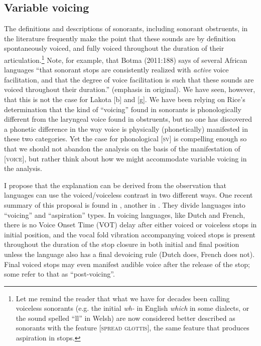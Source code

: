 \documentclass[output=paper]{LSP/langsci}
\begin{document}
\subsection{Variable voicing}

The definitions and descriptions of sonorants, including sonorant obstruents, in the literature frequently make the point that these sounds are by definition spontaneously voiced, and fully voiced throughout the duration of their articulation.\footnote{Let me remind the reader that what we have for decades been calling voiceless sonorants (e.g. the initial \textit{wh-} in English \textit{which} in some dialects, or the sound spelled ``ll'' in Welsh) are now considered better described as sonorants with the feature [\textsc{spread glottis}], the same feature that produces aspiration in stops.} Note, for example, that Botma (2011:188) says of several African languages ``that sonorant stops are consistently realized with \textit{active} voice facilitation, and that the degree of voice facilitation is such that these sounds are voiced throughout their duration.'' (emphasis in original). We have seen, however, that this is not the case for Lakota [b] and [g]. We have been relying on Rice's determination that the kind of ``voicing'' found in sonorants is phonologically different from the laryngeal voice found in obstruents, but no one has discovered a phonetic difference in the way voice is physically (phonetically) manifested in these two categories. Yet the case for phonological [\textsc{sv}] is compelling enough so that we should not abandon the analysis on the basis of the manifestation of [\textsc{voice}], but rather think about how we might accommodate variable voicing in the analysis.

I propose that the explanation can be derived from the observation that languages can use the voiced/voiceless contrast in two different ways. One recent summary of this proposal is found in \citet[15--19]{Harris2009}, another in \citet{RingenEtAl2013}. They divide languages into ``voicing'' and ``aspiration'' types. In voicing languages, like Dutch and French, there is no Voice Onset Time (VOT) delay after either voiced or voiceless stops in initial position, and the vocal fold vibration accompanying voiced stops is present throughout the duration of the stop closure in both initial and final position unless the language also has a final devoicing rule (Dutch does, French does not). Final voiced stops may even manifest audible voice after the release of the stop; some refer to that as ``post-voicing''.
\end{document}
